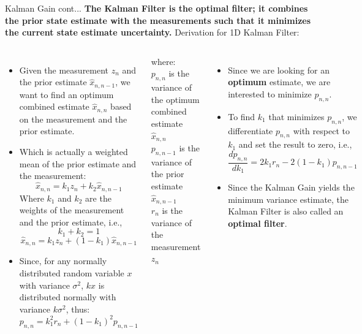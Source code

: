 \begin{frame}{Kalman Gain cont...}
\textbf{The Kalman Filter is the optimal filter; it combines the prior state estimate with the measurements such that it minimizes the current state estimate uncertainty.} Derivation for 1D Kalman Filter:
\begin{columns}
        \begin{itemize}
            \item Given the measurement $z_n$ and the prior estimate $\hat{x}_{n,n-1}$, we want to find an optimum combined estimate $\hat{x}_{n,n}$ based on the measurement and the prior estimate.
            \item Which is actually a weighted mean of the prior estimate and the measurement:
            $$\hat{x}_{n,n}=k_1 z_n + k_2 \hat{x}_{n,n-1}$$
            Where $k_1$ and $k_2$ are the weights of the measurement and the prior estimate, i.e.,
            $$k_1 + k_2 = 1$$
            $$\hat{x}_{n,n}=k_1 z_n + (1-k_1) \hat{x}_{n,n-1}$$
            \item Since, for any normally distributed random variable $x$ with variance $\sigma^2$, $kx$ is distributed normally with variance $k\sigma^2$, thus:
            $${p}_{n,n}=k_1^2 r_n + (1-k_1)^2 {p}_{n,n-1}$$
    \end{itemize}
    where:\\
    $p_{n,n}$ is the variance of the optimum combined estimate $\hat{x}_{n,n}$\\
    $p_{n,n-1}$ is the variance of the prior estimate $\hat{x}_{n,n-1}$\\
    $r_n$ is the variance of the measurement $z_n$
    \begin{itemize}
        \item Since we are looking for an \textbf{optimum} estimate, we are interested to minimize $p_{n,n}$.
        \item To find $k_1$ that minimizes $p_{n,n}$, we differentiate $p_{n,n}$ with respect to $k_1$ and set the result to zero, i.e.,
        $$\frac{d p_{n,n}}{d k_1} = 2k_1r_n - 2 (1-k_1)p_{n,n-1}$$
        
        \item Since the Kalman Gain yields the minimum variance estimate, the Kalman Filter is also called an \textbf{optimal filter}.
    \end{itemize}
\end{columns}

\end{frame}

